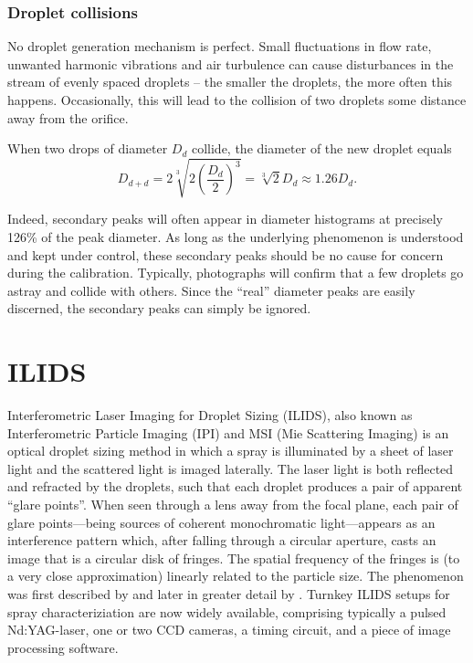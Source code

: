 \documentclass[11.5pt]{book}
\begin{document}
\subsection{Droplet collisions}
\label{sec:droplet-collisions}
No droplet generation mechanism is perfect. Small fluctuations in flow rate,
unwanted harmonic vibrations and air turbulence can cause disturbances in the
stream of evenly spaced droplets -- the smaller the droplets, the more often
this happens. Occasionally, this will lead to the collision
of two droplets some distance away from the orifice.

When two drops of diameter $D_d$ collide, the diameter of the new droplet equals
\begin{equation}
    D_{d+d} = 2\sqrt[3]{2\left(\frac{D_d}{2}\right)^3} = \sqrt[3]{2} D_d \approx
    1.26 D_d.
\end{equation}

Indeed, secondary peaks will often appear in diameter histograms at precisely 126\% of
the peak diameter. As long as the underlying phenomenon is understood and kept
under control, these secondary peaks should be no cause for concern during the
calibration. Typically, photographs will confirm that a few droplets go astray
and collide with others. Since the ``real'' diameter peaks are easily discerned,
the secondary peaks can simply be ignored.

\chapter[ILIDS]{ILIDS}
Interferometric Laser Imaging for Droplet Sizing (ILIDS), also known as
Interferometric Particle Imaging (IPI) and MSI (Mie Scattering Imaging) is an
optical droplet sizing method in which a spray is illuminated by a sheet of
laser light and the scattered light is imaged laterally. The laser light is both
reflected and refracted by the droplets, such that each droplet produces a pair
of apparent ``glare points''. When seen through a lens away from the focal
plane, each pair of glare points---being sources of coherent monochromatic
light---appears as an interference pattern which, after falling through a
circular aperture, casts an image that is a circular disk of fringes.  The
spatial frequency of the fringes is (to a very close approximation) linearly
related to the particle size. The phenomenon was first described by
\citet{Konig86} and later in greater detail by \citet{Glover95}. Turnkey ILIDS
setups for spray characteriziation are now widely available, comprising
typically a pulsed Nd:YAG-laser, one or two CCD cameras, a timing circuit, and a
piece of image processing software.
\end{document}
